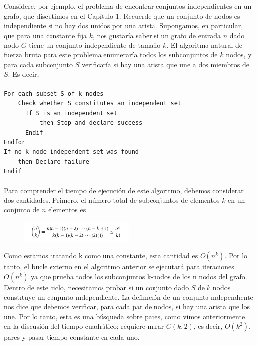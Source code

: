 \documentclass[a4paper, 12pt]{book}
\theoremstyle{dotless}
\begin{document}
Considere, por ejemplo, el problema de encontrar conjuntos independientes en un grafo, que discutimos en el Capítulo 1. Recuerde que un conjunto de nodos es independiente si no hay dos unidos por una arista. Supongamos, en particular, que para una constante fija $k$, nos gustaría saber si un grafo de entrada $n$ dado nodo $G$ tiene un conjunto independiente de tamaño $k$. El algoritmo natural de fuerza bruta para este problema enumeraría todos los subconjuntos de $k$ nodos, y para cada subconjunto $S$ verificaría si hay una arista que une a dos miembros de $S$. Es decir, \\
\paragraph{}
\begin{lstlisting}
For each subset S of k nodes
	Check whether S constitutes an independent set
      If S is an independent set 
          then Stop and declare success
      Endif
Endfor
If no k-node independent set was found 
	then Declare failure
Endif
\end{lstlisting}
\paragraph{}

Para comprender el tiempo de ejecución de este algoritmo, debemos considerar dos cantidades. Primero, el número total de subconjuntos de elementos $k$ en un conjunto de $n$ elementos es\\



\begin{figure}[h] 
  \centering
    \includegraphics[width=0.5\textwidth]{Imagenes-Seccion2/form_2_3.PNG}
\end{figure}


Como estamos tratando k como una constante, esta cantidad es $O(n^k)$. Por lo tanto, el bucle externo en el algoritmo anterior se ejecutará para iteraciones $O(n^k)$ ya que prueba todos los subconjuntos k-nodos de los n nodos del grafo.\\

Dentro de este ciclo, necesitamos probar si un conjunto dado $S$ de $k$ nodos constituye un conjunto independiente. La definición de un conjunto independiente nos dice que debemos verificar, para cada par de nodos, si hay una arista que los une. Por lo tanto, esta es una búsqueda sobre pares, como vimos anteriormente en la discusión del tiempo cuadrático; requiere mirar $C(k,2)$, es decir, $O(k^2)$, pares y pasar tiempo constante en cada uno.\\
\end{document}
